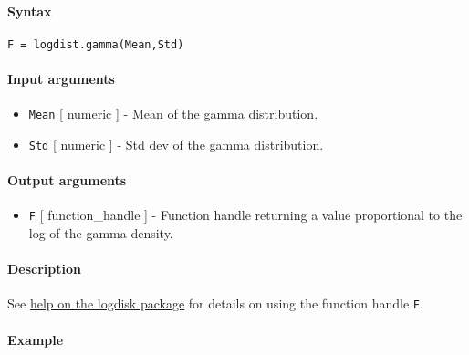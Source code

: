 


	\paragraph{Syntax}\label{syntax}

\begin{verbatim}
F = logdist.gamma(Mean,Std)
\end{verbatim}

\paragraph{Input arguments}\label{input-arguments}

\begin{itemize}
\item
  \texttt{Mean} {[} numeric {]} - Mean of the gamma distribution.
\item
  \texttt{Std} {[} numeric {]} - Std dev of the gamma distribution.
\end{itemize}

\paragraph{Output arguments}\label{output-arguments}

\begin{itemize}
\itemsep1pt\parskip0pt
\item
  \texttt{F} {[} function\_handle {]} - Function handle returning a
  value proportional to the log of the gamma density.
\end{itemize}

\paragraph{Description}\label{description}

See \href{logdist/Contents}{help on the logdisk package} for details on
using the function handle \texttt{F}.

\paragraph{Example}\label{example}


